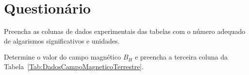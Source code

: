 \cleardoublepage


\vspace{15mm}

\begin{fullwidth}
\noindent{}
\vspace{5mm}

\noindent{}

\noindent{}

\noindent{}

\noindent{}

\noindent{}
\end{fullwidth}

\vspace{5mm}

\section{Questionário}

\begin{question}[type={exam}]{2}
Preencha as colunas de dados experimentais das tabelas com o número adequado de algarismos significativos e unidades.
\end{question}

\begin{question}[type={exam}]{2}
Determine o valor do campo magnético $B_H$ e preencha a terceira coluna da Tabela~\ref{Tab:DadosCampoMagneticoTerrestre}.
\end{question}

